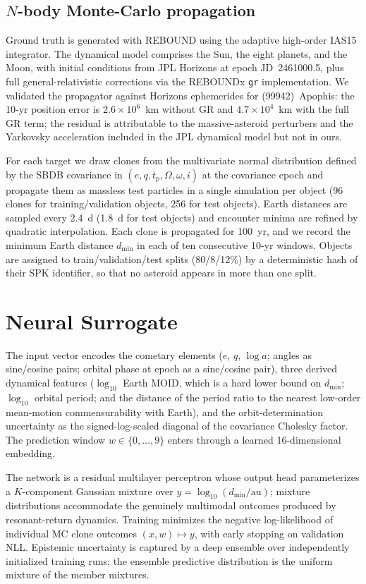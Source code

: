 \documentclass[twocolumn]{aastex631}
\begin{document}
\subsection{$N$-body Monte-Carlo propagation}

Ground truth is generated with REBOUND using the adaptive high-order IAS15
integrator. The dynamical model comprises the Sun, the eight planets, and
the Moon, with initial conditions from JPL Horizons at epoch
JD~2461000.5, plus full general-relativistic corrections via the REBOUNDx
\texttt{gr} implementation. We validated the propagator against Horizons
ephemerides for (99942)~Apophis: the 10-yr position error is
$2.6\times10^{6}$~km without GR and $4.7\times10^{4}$~km with the full GR
term; the residual is attributable to the massive-asteroid perturbers and
the Yarkovsky acceleration included in the JPL dynamical model
\citep{Farnocchia2013} but not in ours.

For each target we draw clones from the multivariate normal distribution
defined by the SBDB covariance in $(e, q, t_p, \Omega, \omega, i)$ at the
covariance epoch and propagate them as massless test particles in a single
simulation per object (96 clones for training/validation objects, 256 for
test objects). Earth distances are sampled every 2.4~d (1.8~d for test
objects) and encounter minima are refined by quadratic interpolation. Each
clone is propagated for 100~yr, and we record the minimum Earth distance
$d_{\min}$ in each of ten consecutive 10-yr windows. Objects are assigned
to train/validation/test splits (80/8/12\%) by a deterministic hash of
their SPK identifier, so that no asteroid appears in more than one split.

\section{Neural Surrogate}\label{sec:model}

The input vector encodes the cometary elements ($e$, $q$, $\log a$;
angles as sine/cosine pairs; orbital phase at epoch as a sine/cosine pair),
three derived dynamical features ($\log_{10}$ Earth MOID, which is a hard
lower bound on $d_{\min}$; $\log_{10}$ orbital period; and the distance of
the period ratio to the nearest low-order mean-motion commensurability with
Earth), and the orbit-determination uncertainty as the signed-log-scaled
diagonal of the covariance Cholesky factor. The prediction window
$w \in \{0,\dots,9\}$ enters through a learned 16-dimensional embedding.

The network is a residual multilayer perceptron whose output head
parameterizes a $K$-component Gaussian mixture over $y = \log_{10}
(d_{\min}/\mathrm{au})$; mixture distributions accommodate the genuinely
multimodal outcomes produced by resonant-return dynamics. Training
minimizes the negative log-likelihood of individual MC clone outcomes
$(x, w) \mapsto y$, with early stopping on validation NLL. Epistemic
uncertainty is captured by a deep ensemble over independently initialized
training runs; the ensemble predictive distribution is the uniform mixture
of the member mixtures.
\end{document}
